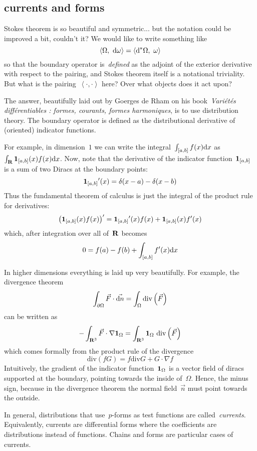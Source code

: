\subsection{currents and forms}

Stokes theorem is so beautiful and symmetric... but the
notation could be improved a bit, couldn't it?  We would like to write
something like
\[
	\left\langle
	\Omega,\ \mathrm{d}\omega
	\right\rangle
	=
	\left\langle
	\mathrm{d}^*\Omega,\ \omega
	\right\rangle
\]
so that the boundary operator is~\emph{defined} as the adjoint of the
exterior derivative with respect to the pairing, and Stokes theorem itself is
a notational triviality.  But what is the
pairing~$\left\langle\cdot,\cdot\right\rangle$ here?  Over what objects does
it act upon?

The answer, beautifully laid out by Goerges de Rham
on his book~\emph{Variétés différentiables : formes,
courants, formes harmoniques}, is to use distribution theory.  The boundary
operator is defined as the distributional derivative of (oriented) indicator
functions.

For example, in dimension~$1$ we can write the integral~$\int_{[a,b]}f(x)\mathrm{d} x$
as~$\int_{\mathbf{R}}\mathbf{1}_{[a,b]}(x)f(x)\mathrm{d} x$.  Now, note that the derivative of the
indicator function~$\mathbf{1}_{[a,b]}$ is a sum of two Diracs at the boundary points:
\[
	{\mathbf{1}_{[a,b]}}'(x)=\delta(x-a)-\delta(x-b)
\]
Thus the fundamental theorem of calculus is just the integral of the product
rule for derivatives:
\[
	\left(\mathbf{1}_{[a,b]}(x)f(x)\right)'={\mathbf{1}_{[a,b]}}'(x)f(x)+\mathbf{1}_{[a,b]}(x)f'(x)
\]
which, after integration over all of~$\mathbf{R}$ becomes
\[
	0 = f(a)-f(b)+\int_{[a,b]}f'(x)\mathrm{d} x
\]

In higher dimensions everything is laid up very beautifully.  For example,
the divergence theorem
\[
	\int_{\partial\Omega} \vec F\cdot\vec{\mathrm{d} n} =
	\int_\Omega\mathrm{div}\left(\vec F\right)
\]
can be written as
\[
	-\int_{\mathbf{R}^3}
	\vec F\cdot \nabla\mathbf{1}_\Omega
	=
	\int_{\mathbf{R}^3}
	\mathbf{1}_\Omega\ \mathrm{div}\left(\vec F\right)
\]
which comes formally from the product rule of the divergence
\[
	\mathrm{div}\left(fG\right)=f\mathrm{div}G+G\cdot\nabla f
\]
Intuitively, the gradient of the indicator function~$\mathbf{1}_\Omega$ is a vector field of
diracs supported at the boundary, pointing towards the inside of~$\Omega$.
Hence, the minus sign, because in the divergence theorem the normal
field~$\vec n$ must point towards the outside.

In general, distributions that use~$p$-forms as test functions are
called~\emph{currents}.  Equivalently, currents are differential forms where
the coefficients are distributions instead of functions.
Chains and forms are particular cases of currents.

